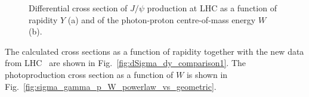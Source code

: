 \documentclass[12pt]{article}
\begin{document}
\begin{figure}[!h]
  \centering
  \caption{Differential cross section of $J/\psi$ production at LHC as a function of rapidity $Y$ (a) and of the photon-proton centre-of-mass energy $W$ (b).}
\end{figure}

The calculated cross sections as a function of rapidity together with the new data from LHC~\cite{LHCb1, LHCb2} are shown in Fig.~\ref{fig:dSigma_dy_comparison1}.
The photoproduction cross section as a function of $W$ is shown in Fig.~\ref{fig:sigma_gamma_p_W_powerlaw_vs_geometric}.
\end{document}
